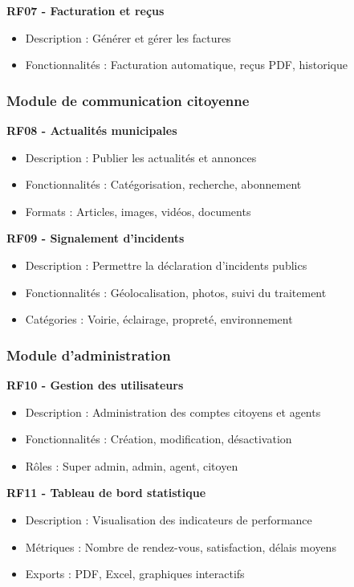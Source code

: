\textbf{RF07 - Facturation et reçus}
\begin{itemize}
\item Description : Générer et gérer les factures
\item Fonctionnalités : Facturation automatique, reçus PDF, historique
\end{itemize}

\subsubsection{Module de communication citoyenne}

\textbf{RF08 - Actualités municipales}
\begin{itemize}
\item Description : Publier les actualités et annonces
\item Fonctionnalités : Catégorisation, recherche, abonnement
\item Formats : Articles, images, vidéos, documents
\end{itemize}

\textbf{RF09 - Signalement d'incidents}
\begin{itemize}
\item Description : Permettre la déclaration d'incidents publics
\item Fonctionnalités : Géolocalisation, photos, suivi du traitement
\item Catégories : Voirie, éclairage, propreté, environnement
\end{itemize}

\subsubsection{Module d'administration}

\textbf{RF10 - Gestion des utilisateurs}
\begin{itemize}
\item Description : Administration des comptes citoyens et agents
\item Fonctionnalités : Création, modification, désactivation
\item Rôles : Super admin, admin, agent, citoyen
\end{itemize}

\textbf{RF11 - Tableau de bord statistique}
\begin{itemize}
\item Description : Visualisation des indicateurs de performance
\item Métriques : Nombre de rendez-vous, satisfaction, délais moyens
\item Exports : PDF, Excel, graphiques interactifs
\end{itemize}

